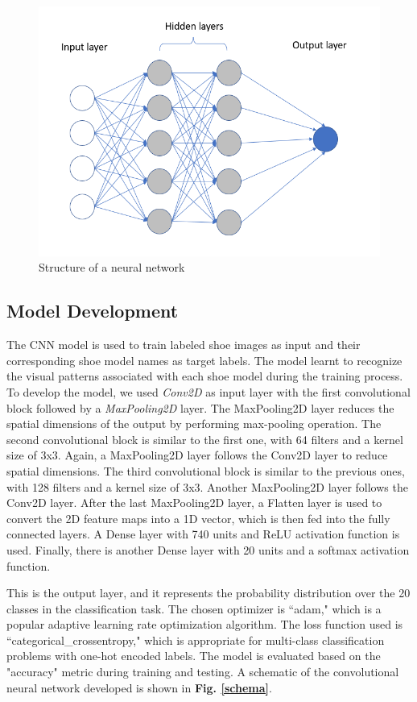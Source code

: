 \documentclass[11pt,a4paper]{article}
\begin{document}
 \begin{figure}[h!]
\centering
  \includegraphics[width=0.75\linewidth]{neural network.png}
  \caption{Structure of a neural network}
  \label{neural_network}
\end{figure}

\subsection{Model Development}
The CNN model is used to train labeled shoe images as input and their corresponding shoe model names as target labels. The model learnt to recognize the visual patterns associated with each shoe model during the training process.  To develop the model, we used \emph{Conv2D} as input layer with the first convolutional block followed by a \emph{MaxPooling2D} layer. The MaxPooling2D layer reduces the spatial dimensions of the output by performing max-pooling operation. The second convolutional block is similar to the first one, with 64 filters and a kernel size of 3x3. Again, a MaxPooling2D layer follows the Conv2D layer to reduce spatial dimensions. The third convolutional block is similar to the previous ones, with 128 filters and a kernel size of 3x3. Another MaxPooling2D layer follows the Conv2D layer. After the last MaxPooling2D layer, a Flatten layer is used to convert the 2D feature maps into a 1D vector, which is then fed into the fully connected layers. A Dense layer with 740 units and ReLU activation function is used. Finally, there is another Dense layer with 20 units and a softmax activation function.  

This is the output layer, and it represents the probability distribution over the 20 classes in the classification task. The chosen optimizer is ``adam," which is a popular adaptive learning rate optimization algorithm. The loss function used is ``categorical\_crossentropy," which is appropriate for multi-class classification problems with one-hot encoded labels. The model is evaluated based on the "accuracy" metric during training and testing. A schematic of the convolutional neural network developed is shown in \textbf{Fig. \ref{schema}}.
\end{document}
